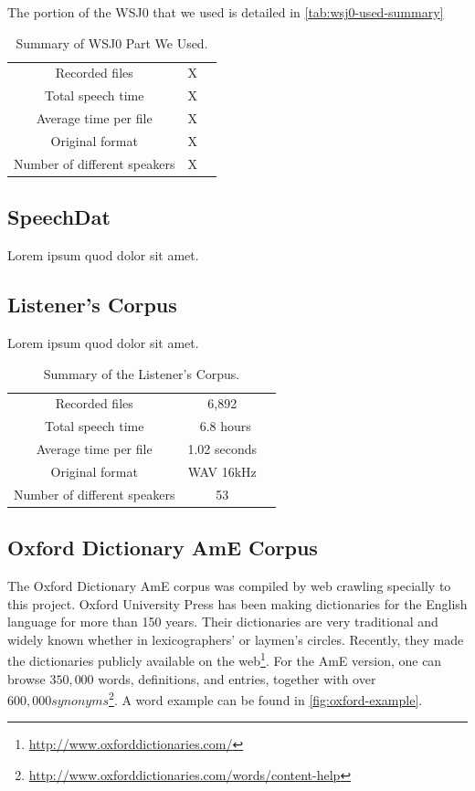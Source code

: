 The portion of the WSJ0 that we used is detailed in \autoref{tab:wsj0-used-summary}

\begin{table}[!htb]
\caption[Summary of WSJ0 Part We Used.]{Summary of WSJ0 Part We Used.}
\smallskip
\centering
\begin{tabular}{ccc} \toprule
  Recorded files & X \\
  Total speech time & X \\
  Average time per file & X \\
  Original format & X \\
  Number of different speakers & X \\
  \bottomrule
\end{tabular}
\label{tab:wsj0-used-summary}
\end{table}


\subsection{SpeechDat}
Lorem ipsum quod dolor sit amet.

\subsection{Listener's Corpus}
Lorem ipsum quod dolor sit amet.

\begin{table}[!htb]
\caption[Summary of Listener's Corpus.]{Summary of the Listener's Corpus.}
\smallskip
\centering
\begin{tabular}{ccc} \toprule
  Recorded files & 6,892 \\
  Total speech time & ~6.8 hours \\
  Average time per file & 1.02 seconds \\
  Original format & WAV 16kHz \\
  Number of different speakers & 53 \\
  \bottomrule
\end{tabular}
\end{table}

\subsection{Oxford Dictionary AmE Corpus}
The Oxford Dictionary \ac{AmE} corpus was compiled by web crawling specially to this project. Oxford University Press
has been making dictionaries for the English language for more than 150 years. Their dictionaries are very traditional and widely 
known whether in lexicographers' or laymen's circles. Recently, they made the dictionaries publicly available
on the web\footnote{\url{http://www.oxforddictionaries.com/}}. For the \ac{AmE} version, one can browse $350,000$ words, definitions, 
and entries, together with over $600,000 synonyms$\footnote{\url{http://www.oxforddictionaries.com/words/content-help}}.
A word example can be found in \autoref{fig:oxford-example}.

